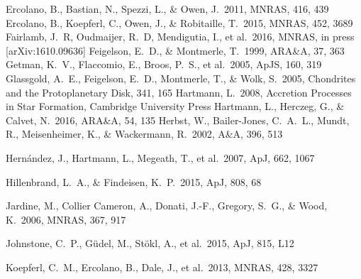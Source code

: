 \documentclass[10pt,fleqn,twoside]{article}
\newcommand*\aap{A\&A}
\newcommand*\apj{ApJ}
\newcommand*\apjl{ApJ}
\newcommand*\apjs{ApJS}
\newcommand*\araa{ARA\&A}
\newcommand*\mnras{MNRAS}
\begin{document}
\begin{thebibliography}{}
 Ercolano, B., Bastian, N., Spezzi, L., \& Owen, J.\ 2011, \mnras, 416, 439
 Ercolano, B., Koepferl, C., Owen, J., \& Robitaille, T.\ 2015, \mnras, 452, 3689 
 Fairlamb, J.~R, Oudmaijer, R.~D, Mendigutia, I., et al.\ 2016, 
\mnras, in press [arXiv:1610.09636]
 Feigelson, E.~D., \& Montmerle, T.\ 1999, \araa, 37, 363 
 Getman, K.~V., Flaccomio, E., Broos, P.~S., et al.\ 2005, \apjs, 160, 319 
 Glassgold, A.~E., Feigelson, E.~D., Montmerle, T., \& Wolk, S.\ 2005, Chondrites and the Protoplanetary Disk, 341, 165
 Hartmann, L.\ 2008, Accretion Processes in Star Formation,  Cambridge University Press
 Hartmann, L., Herczeg, G., \& Calvet, N.\ 2016, \araa, 54, 135 
 Herbst, W., Bailer-Jones, C.~A.~L., Mundt, R., Meisenheimer, K., \& Wackermann, R.\ 2002, \aap, 396, 513 

 Hern{\'a}ndez, J., Hartmann, L., Megeath, T., et al.\ 2007, \apj, 662, 1067 

 Hillenbrand, L.~A., \& Findeisen, K.~P.\ 2015, \apj, 808, 68 

 Jardine, M., Collier Cameron, A., Donati, J.-F., Gregory, S.~G., \& Wood, K.\ 2006, \mnras, 367, 917

 Johnstone, C.~P., G{\"u}del, M., St{\"o}kl, A., et al.\ 2015, \apjl, 815, L12

 Koepferl, C.~M., Ercolano, B., Dale, J., et al.\ 2013, \mnras, 428, 3327


\end{thebibliography}
\end{document}
